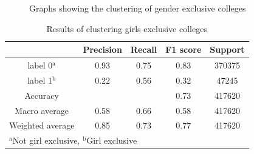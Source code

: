 \begin{figure}[t]
    \centering
    \quad
    \caption{Graphs showing the clustering of gender exclusive colleges}
    \label{cluster2_graphs}
\end{figure}


\begin{table}[htbp]
    \caption{Results of clustering girls exclusive colleges}
    \label{cluster2}
    \begin{center}
    \begin{tabular}{|c|c|c|c|c|}
    \hline
     
     & \textbf{Precision}& \textbf{Recall}& \textbf{F1 score} & \textbf{Support}  \\
    \hline
    
    label 0$^{\mathrm{a}}$ & 0.93 & 0.75 & 0.83 & 370375 \\\hline
    label 1$^{\mathrm{b}}$ & 0.22 & 0.56 & 0.32 & 47245 \\\hline
    Accuracy &  &  & 0.73 & 417620 \\\hline
    Macro average & 0.58 & 0.66 & 0.58 & 417620 \\\hline
    Weighted average & 0.85 & 0.73 & 0.77 & 417620 \\

    \hline

    \multicolumn{4}{l}{$^{\mathrm{a}}$Not girl exclusive, $^{\mathrm{b}}$Girl exclusive}
    \end{tabular}
    \end{center}
\end{table}

